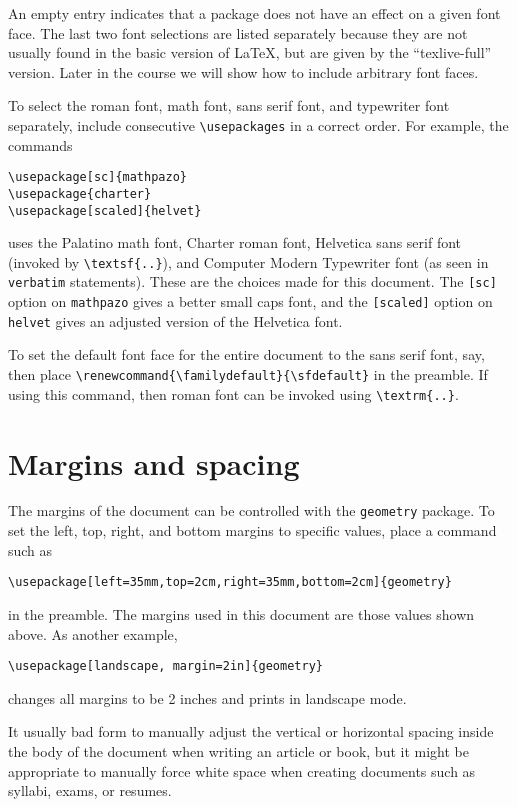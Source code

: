 \documentclass[11pt]{article}
\begin{document}
An empty entry indicates that a package does not have an effect on a given font face.  
The last two font selections are listed separately because they are not usually found 
in the basic version of \LaTeX{}, but are given by the ``texlive-full'' version.  
Later in the course we will show how to include arbitrary font faces.

To select the roman font, math font, sans serif font, and typewriter font separately, 
include consecutive \verb~\usepackages~ in a correct order.  For example, the commands
\begin{verbatim}
\usepackage[sc]{mathpazo}
\usepackage{charter}
\usepackage[scaled]{helvet}
\end{verbatim}
uses the Palatino math font, Charter roman font, \textsf{Helvetica sans serif font} 
(invoked by \verb~\textsf{..}~), and Computer Modern Typewriter font (as seen 
in \verb~verbatim~ statements).  These are the choices made for this document.  
The \verb~[sc]~ option on \verb~mathpazo~ gives a better small caps font, and the 
\verb~[scaled]~ option on \verb~helvet~ gives an adjusted version of the Helvetica 
font.

To set the default font face for the entire document to the sans serif font, say, then
place \verb~\renewcommand{\familydefault}{\sfdefault}~ in the preamble.  If using this
command, then roman font can be invoked using \verb~\textrm{..}~. 

\section{Margins and spacing}

The margins of the document can be controlled with the \verb~geometry~ package.  To 
set the left, top, right, and bottom margins to specific values, place a command such 
as 
\begin{verbatim}
\usepackage[left=35mm,top=2cm,right=35mm,bottom=2cm]{geometry}
\end{verbatim}
in the preamble.  The margins used in this document are those values shown above.  As 
another example,
\begin{verbatim}
\usepackage[landscape, margin=2in]{geometry}
\end{verbatim}
changes all margins to be 2 inches and prints in landscape mode.

It usually bad form to manually adjust the vertical or horizontal spacing inside the 
body of the document when writing an article or book, but it might be appropriate to 
manually force white space when creating documents such as syllabi, exams, or resumes. 
\end{document}
